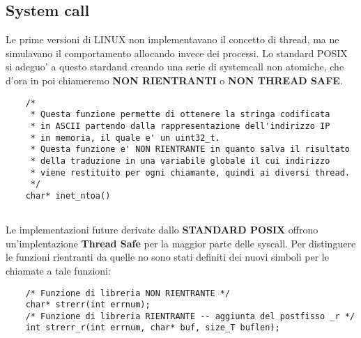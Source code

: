 \documentclass{article}
\begin{document}
    \subsection{System call}
    Le prime versioni di LINUX non implementavano il concetto
    di thread, ma ne simulavano il comportamento allocando 
    invece dei processi.
    Lo standard POSIX si adeguo' a questo stardand creando
    una serie di systemcall non atomiche, che d'ora in poi chiameremo
    \textbf{NON RIENTRANTI} o \textbf{NON THREAD SAFE}.
    \begin{verbatim}
    /*
     * Questa funzione permette di ottenere la stringa codificata
     * in ASCII partendo dalla rappresentazione dell'indirizzo IP
     * in memoria, il quale e' un uint32_t. 
     * Questa funzione e' NON RIENTRANTE in quanto salva il risultato
     * della traduzione in una variabile globale il cui indirizzo 
     * viene restituito per ogni chiamante, quindi ai diversi thread.
     */
    char* inet_ntoa()
                
    \end{verbatim}
    Le implementazioni future derivate dallo \textbf{STANDARD POSIX} 
    offrono un'implentazione \textbf{Thread Safe} per la maggior parte
    delle syscall.
    Per distinguere le funzioni rientranti da quelle no sono stati
    definiti dei nuovi simboli per le chiamate a tale funzioni:
    \begin{verbatim}
    /* Funzione di libreria NON RIENTRANTE */ 
    char* strerr(int errnum); 
    /* Funzione di libreria RIENTRANTE -- aggiunta del postfisso _r */
    int strerr_r(int errnum, char* buf, size_T buflen);
    \end{verbatim}
\newpage
\end{document}
